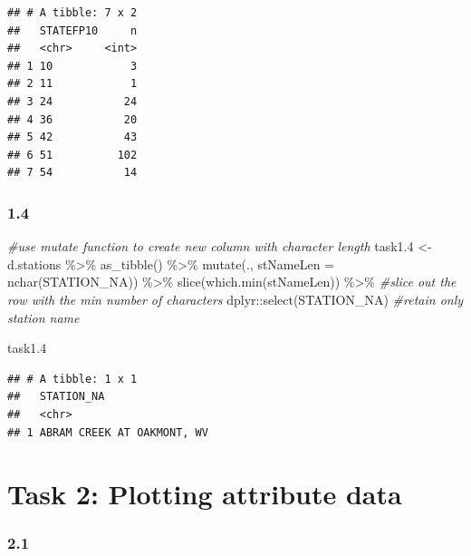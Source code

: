 \documentclass[
]{article}
\newenvironment{Shaded}{\begin{snugshade}}{\end{snugshade}}
\newcommand{\AttributeTok}[1]{\textcolor[rgb]{0.77,0.63,0.00}{#1}}
\newcommand{\CommentTok}[1]{\textcolor[rgb]{0.56,0.35,0.01}{\textit{#1}}}
\newcommand{\FloatTok}[1]{\textcolor[rgb]{0.00,0.00,0.81}{#1}}
\newcommand{\FunctionTok}[1]{\textcolor[rgb]{0.00,0.00,0.00}{#1}}
\newcommand{\NormalTok}[1]{#1}
\newcommand{\OtherTok}[1]{\textcolor[rgb]{0.56,0.35,0.01}{#1}}
\newcommand{\SpecialCharTok}[1]{\textcolor[rgb]{0.00,0.00,0.00}{#1}}
\begin{document}
\begin{verbatim}
## # A tibble: 7 x 2
##   STATEFP10     n
##   <chr>     <int>
## 1 10            3
## 2 11            1
## 3 24           24
## 4 36           20
## 5 42           43
## 6 51          102
## 7 54           14
\end{verbatim}

\hypertarget{section-3}{%
\subsubsection{1.4}\label{section-3}}

\begin{Shaded}
\begin{Highlighting}[]
\CommentTok{\#use mutate function to create new column with character length}
\NormalTok{task1}\FloatTok{.4} \OtherTok{\textless{}{-}}\NormalTok{ d.stations }\SpecialCharTok{\%\textgreater{}\%} \FunctionTok{as\_tibble}\NormalTok{() }\SpecialCharTok{\%\textgreater{}\%} 
  \FunctionTok{mutate}\NormalTok{(., }\AttributeTok{stNameLen =} \FunctionTok{nchar}\NormalTok{(STATION\_NA)) }\SpecialCharTok{\%\textgreater{}\%}  
  \FunctionTok{slice}\NormalTok{(}\FunctionTok{which.min}\NormalTok{(stNameLen)) }\SpecialCharTok{\%\textgreater{}\%} \CommentTok{\#slice out the row with the min number of characters}
\NormalTok{  dplyr}\SpecialCharTok{::}\FunctionTok{select}\NormalTok{(STATION\_NA) }\CommentTok{\#retain only station name}

\NormalTok{task1}\FloatTok{.4}
\end{Highlighting}
\end{Shaded}

\begin{verbatim}
## # A tibble: 1 x 1
##   STATION_NA                
##   <chr>                     
## 1 ABRAM CREEK AT OAKMONT, WV
\end{verbatim}

\hypertarget{task-2-plotting-attribute-data}{%
\section{Task 2: Plotting attribute
data}\label{task-2-plotting-attribute-data}}

\hypertarget{section-4}{%
\subsubsection{2.1}\label{section-4}}
\end{document}
